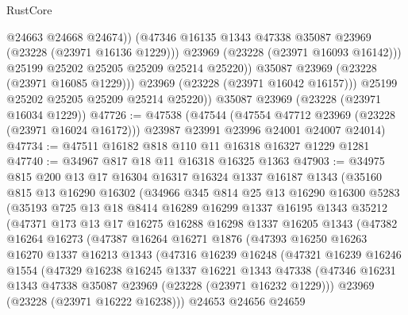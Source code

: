\begin{lexlean}{RustCore}
\begin{coremodule}
                      @24663
                      @24668
                      @24674))
                  (@47346 @16135 @1343 @47338 @35087 @23969 (@23228 (@23971 @16136 @1229)))
                  @23969
                  (@23228 (@23971 @16093 @16142)))
                @25199
                @25202
                @25205
                @25209
                @25214
                @25220))
            @35087
            @23969
            (@23228 (@23971 @16085 @1229)))
          @23969
          (@23228 (@23971 @16042 @16157)))
        @25199
        @25202
        @25205
        @25209
        @25214
        @25220))
    @35087
    @23969
    (@23228 (@23971 @16034 @1229))
@47726 := @47538
    (@47544
      (@47554 @47712 @23969 (@23228 (@23971 @16024 @16172)))
      @23987
      @23991
      @23996
      @24001
      @24007
      @24014)
@47734 := @47511 @16182 @818 @110 @11 @16318 @16327 @1229 @1281
@47740 := @34967 @817 @18 @11 @16318 @16325 @1363
@47903 := @34975
    @815
    @200
    @13
    @17
    @16304
    @16317
    @16324
    @1337
    @16187
    @1343
    (@35160
      @815
      @13
      @16290
      @16302
      (@34966
        @345
        @814
        @25
        @13
        @16290
        @16300
        @5283
        (@35193
          @725
          @13
          @18
          @8414
          @16289
          @16299
          @1337
          @16195
          @1343
          @35212
          (@47371
            @173
            @13
            @17
            @16275
            @16288
            @16298
            @1337
            @16205
            @1343
            (@47382
              @16264
              @16273
              (@47387
                @16264
                @16271
                @1876
                (@47393
                  @16250
                  @16263
                  @16270
                  @1337
                  @16213
                  @1343
                  (@47316
                    @16239
                    @16248
                    (@47321
                      @16239
                      @16246
                      @1554
                      (@47329
                        @16238
                        @16245
                        @1337
                        @16221
                        @1343
                        @47338
                        (@47346 @16231 @1343 @47338 @35087 @23969 (@23228 (@23971 @16232 @1229)))
                        @23969
                        (@23228 (@23971 @16222 @16238)))
                      @24653
                      @24656
                      @24659

\end{coremodule}
\end{lexlean}
